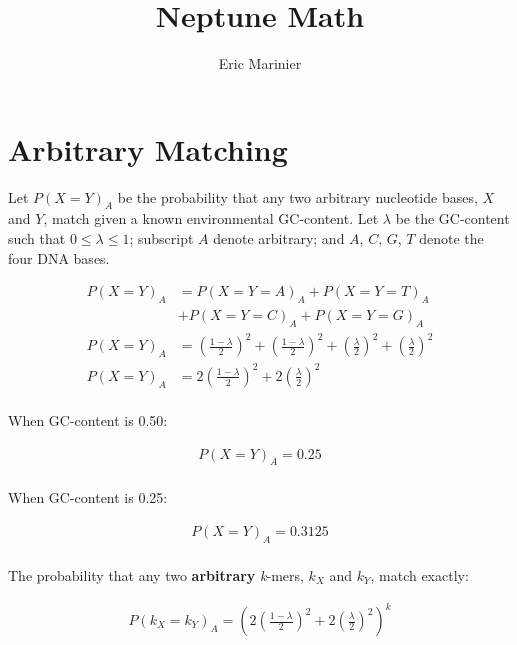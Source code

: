 \documentclass{article}
\title{Neptune Math}
\author{Eric Marinier}
\begin{document}
\maketitle

\newpage
  
\section{Arbitrary Matching}
  
Let \(P(X = Y)_{A}\) be the probability that any two arbitrary nucleotide bases, \(X\) and \(Y\), match given a known environmental GC-content. Let \(\lambda\) be the GC-content such that \(0 \leq \lambda \leq 1\); subscript \(A\) denote arbitrary; and \(A\), \(C\), \(G\), \(T\) denote the four DNA bases.
  
\begin{equation}
\begin{split}
  P(X = Y)_{A} &= P(X = Y = A)_A + P(X = Y = T)_A \\
    &+ P(X = Y = C)_A + P(X = Y = G)_A\\
  P(X = Y)_{A} &= \left(\frac{1 - \lambda}{2}\right)^2 + \left(\frac{1 - \lambda}{2}\right)^2 + \left(\frac{\lambda}{2}\right)^2 + \left(\frac{\lambda}{2}\right)^2 \\
  P(X = Y)_{A} &= 2 \left(\frac{1 - \lambda}{2}\right)^2 + 2 \left(\frac{\lambda}{2}\right)^2 \\
\end{split}
\end{equation}
  
When GC-content is 0.50:
  
\begin{equation}
\begin{split}  
  P(X = Y)_{A} = 0.25 \\
\end{split}
\end{equation}
  
When GC-content is 0.25:
  
\begin{equation}
\begin{split}  
  P(X = Y)_{A} = 0.3125 \\
\end{split}
\end{equation}
  
The probability that any two \textbf{arbitrary} \textit{k}-mers, \(k_X\) and \(k_Y\), match exactly:
  
\begin{equation}
\begin{split}  
  P(k_X = k_Y)_{A} = \left(2 \left(\frac{1 - \lambda}{2}\right)^2 + 2 \left(\frac{\lambda}{2}\right)^2 \right)^k\\
\end{split}
\end{equation}
  
\end{document}
